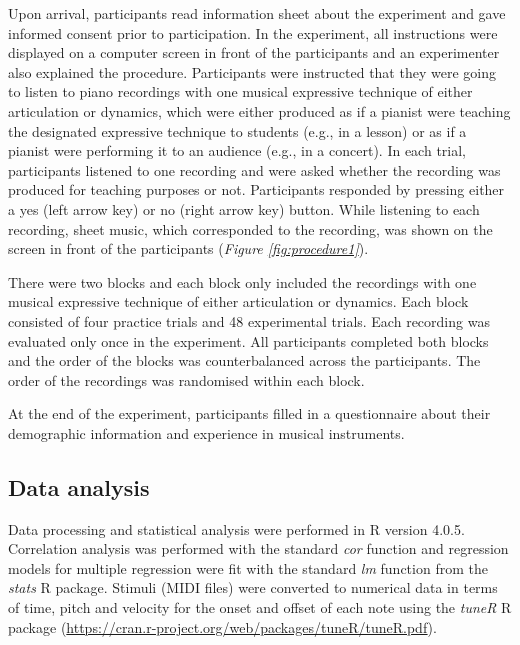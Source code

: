 \documentclass[
  man,floatsintext]{apa6}
\begin{document}
Upon arrival, participants read information sheet about the experiment and gave informed consent prior to participation. In the experiment, all instructions were displayed on a computer screen in front of the participants and an experimenter also explained the procedure. Participants were instructed that they were going to listen to piano recordings with one musical expressive technique of either articulation or dynamics, which were either produced as if a pianist were teaching the designated expressive technique to students (e.g., in a lesson) or as if a pianist were performing it to an audience (e.g., in a concert). In each trial, participants listened to one recording and were asked whether the recording was produced for teaching purposes or not. Participants responded by pressing either a yes (left arrow key) or no (right arrow key) button. While listening to each recording, sheet music, which corresponded to the recording, was shown on the screen in front of the participants (\emph{Figure \ref{fig:procedure1}}).

There were two blocks and each block only included the recordings with one musical expressive technique of either articulation or dynamics. Each block consisted of four practice trials and 48 experimental trials. Each recording was evaluated only once in the experiment. All participants completed both blocks and the order of the blocks was counterbalanced across the participants. The order of the recordings was randomised within each block.

At the end of the experiment, participants filled in a questionnaire about their demographic information and experience in musical instruments.

\hypertarget{data-analysis}{%
\subsection{Data analysis}\label{data-analysis}}

Data processing and statistical analysis were performed in R version 4.0.5. Correlation analysis was performed with the standard \emph{cor} function and regression models for multiple regression were fit with the standard \emph{lm} function from the \emph{stats} R package. Stimuli (MIDI files) were converted to numerical data in terms of time, pitch and velocity for the onset and offset of each note using the \emph{tuneR} R package (\url{https://cran.r-project.org/web/packages/tuneR/tuneR.pdf}).
\end{document}
